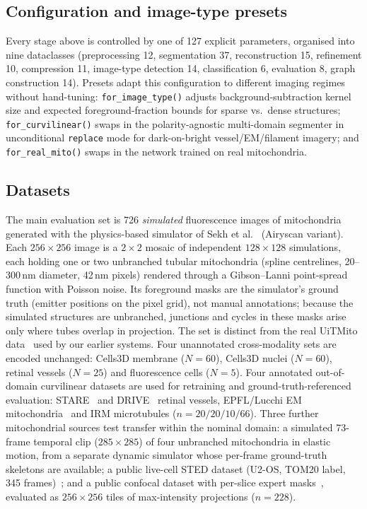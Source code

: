 \documentclass[10pt,a4paper]{article}
\begin{document}
\subsection{Configuration and image-type presets}
\label{sec:config}
Every stage above is controlled by one of 127 explicit parameters, organised
into nine dataclasses (preprocessing 12, segmentation 37, reconstruction 15,
refinement 10, compression 11, image-type detection 14,
classification 6, evaluation 8, graph construction 14). Presets adapt
this configuration to different imaging regimes without hand-tuning:
\texttt{for\_image\_type()} adjusts background-subtraction kernel size and
expected foreground-fraction bounds for sparse vs.\ dense structures;
\texttt{for\_curvilinear()} swaps in the polarity-agnostic
multi-domain segmenter in unconditional \texttt{replace} mode for dark-on-bright
vessel/EM/filament imagery; and \texttt{for\_real\_mito()} swaps in the
network trained on real mitochondria.

\subsection{Datasets}
The main evaluation set is 726 \emph{simulated} fluorescence images of
mitochondria generated with the physics-based simulator of Sekh et
al.~\cite{sekh2021} (Airyscan variant). Each $256\times256$ image is a
$2\times2$ mosaic of independent $128\times128$ simulations, each holding one
or two unbranched tubular mitochondria (spline centrelines, 20--300\,nm
diameter, 42\,nm pixels) rendered through a Gibson--Lanni point-spread
function with Poisson noise. Its foreground masks are the simulator's
ground truth (emitter positions on the pixel grid), not manual
annotations; because the simulated structures are unbranched, junctions
and cycles in these masks arise only where tubes overlap in projection.
The set is distinct from the real UiTMito data~\cite{sekh2021} used by our
earlier systems. Four
unannotated cross-modality sets are encoded unchanged: Cells3D membrane
($N{=}60$), Cells3D nuclei ($N{=}60$), retinal vessels ($N{=}25$) and
fluorescence cells ($N{=}5$). Four annotated out-of-domain curvilinear
datasets are used for retraining and ground-truth-referenced evaluation:
STARE~\cite{stare} and DRIVE~\cite{drive} retinal vessels, EPFL/Lucchi EM
mitochondria~\cite{lucchi} and IRM microtubules ($n=20/20/10/66$). Three
further mitochondrial sources test transfer within the nominal domain: a
simulated 73-frame temporal clip ($285\times285$) of four unbranched
mitochondria in elastic motion, from a separate dynamic simulator whose
per-frame ground-truth skeletons are available; a public
live-cell STED dataset (U2-OS, TOM20 label, 345
frames)~\cite{balakrishnan2024sted}; and a public confocal dataset with
per-slice expert masks~\cite{zhanghao2023mito}, evaluated as
$256\times256$ tiles of max-intensity projections ($n=228$).
\end{document}
